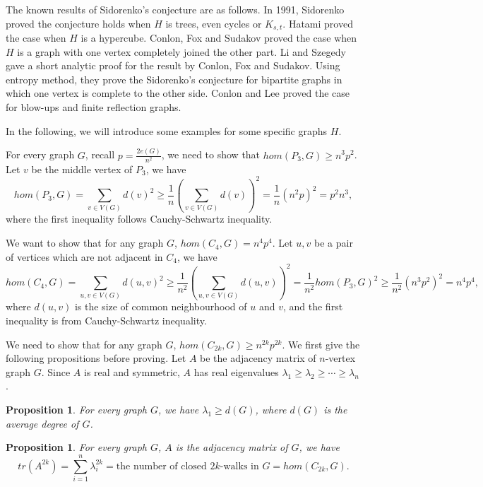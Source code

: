 \documentclass{article}
\newtheorem{proposition}[theorem]{Proposition}
\theoremstyle{definition}
\begin{document}
The known results of Sidorenko's conjecture are as follows.
In 1991, Sidorenko \cite{sidorenko1991inequalities} proved the conjecture holds when $H$ is trees, even cycles or $K_{s,t}$.
Hatami \cite{hatami2010graph} proved the case when $H$ is a hypercube.
Conlon, Fox and Sudakov \cite{conlon2010approximate} proved the case when $H$ is a graph with one vertex completely joined the other part.
Li and Szegedy \cite{li2011logarithimic} gave a short analytic proof for the result by Conlon, Fox and Sudakov. Using entropy method, they prove the Sidorenko's conjecture for bipartite graphs in which one vertex is complete to the other side.
Conlon and Lee \cite{conlon2017finite}\cite{conlon2018sidorenko} proved the case for blow-ups and finite reflection graphs.

In the following, we will introduce some examples for some specific graphs $H$.

 For every graph $G$, recall $p=\frac{2e(G)}{n^2}$, we need to show that $hom(P_3,G)\geq n^3 p^2$. Let $v$ be the middle vertex of $P_3$, we have 
$$hom(P_3,G)=\sum_{v\in V(G)} d(v)^2\geq \frac{1}{n}(\sum_{v\in V(G)} d(v))^2 =\frac{1}{n}(n^2p)^2=p^2 n^3,$$ 
where the first inequality follows Cauchy-Schwartz inequality.

 We want to show that for any graph $G$, $hom(C_4,G)= n^4 p^4$. Let $u,v$ be a pair of vertices which are not adjacent in $C_4$, we have
$$hom(C_4,G)=\sum_{u,v\in V(G)} d(u,v)^2
\geq \frac{1}{n^2}(\sum_{u,v\in V(G)}d(u,v))^2=\frac{1}{n^2} hom(P_3,G)^2
\geq \frac{1}{n^2}(n^3 p^2)^2=n^4 p^4,$$
where $d(u,v)$ is the size of common neighbourhood of $u$ and $v$, and the first inequality is from Cauchy-Schwartz inequality.

We need to show that for any graph $G$, $hom(C_{2k},G)\geq n^{2k} p^{2k}$. We first give the following propositions before proving.
Let $A$ be the adjacency matrix of $n$-vertex graph $G$. Since $A$ is real and symmetric, $A$ has real eigenvalues $\lambda_1\geq\lambda_2\geq \cdots\geq \lambda_n$.

\begin{proposition}
	For every graph $G$, we have $\lambda_1\geq d(G)$, where $d(G)$ is the average degree of $G$.
\end{proposition}

\begin{proposition}
	For every graph $G$, $A$ is the adjacency matrix of $G$, we have
 $$tr(A^{2k})=\sum_{i=1}^{n} \lambda_i ^{2k}=\text{the number of closed $2k$-walks in $G$}=hom(C_{2k},G).$$
\end{proposition}
\end{document}
